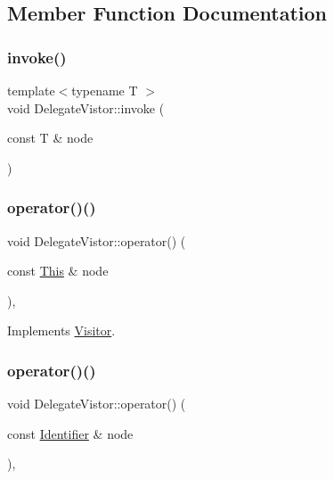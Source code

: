 \subsection{Member Function Documentation}
\mbox{\label{struct_delegate_vistor_af9662a5d46b463eaf5687383d0720da9}} 
\subsubsection{\texorpdfstring{invoke()}{invoke()}}
{\footnotesize\ttfamily template$<$typename T $>$ \\
void Delegate\+Vistor\+::invoke (\begin{DoxyParamCaption}\item[{const T \&}]{node }\end{DoxyParamCaption})\hspace{0.3cm}{\ttfamily [inline]}}

\mbox{\label{struct_delegate_vistor_a8dace5cc6d8f07fa159bf17c0e2ab35d}} 
\subsubsection{\texorpdfstring{operator()()}{operator()()}\hspace{0.1cm}{\footnotesize\ttfamily [1/60]}}
{\footnotesize\ttfamily void Delegate\+Vistor\+::operator() (\begin{DoxyParamCaption}\item[{const \hyperlink{struct_this}{This} \&}]{node }\end{DoxyParamCaption})\hspace{0.3cm}{\ttfamily [inline]}, {\ttfamily [virtual]}}



Implements \hyperlink{struct_visitor_a7a043c9da4e7f8233db48afb82dbc7bc}{Visitor}.

\mbox{\label{struct_delegate_vistor_ac0c8ef853f15168a8ecae04d0a901042}} 
\subsubsection{\texorpdfstring{operator()()}{operator()()}\hspace{0.1cm}{\footnotesize\ttfamily [2/60]}}
{\footnotesize\ttfamily void Delegate\+Vistor\+::operator() (\begin{DoxyParamCaption}\item[{const \hyperlink{struct_identifier}{Identifier} \&}]{node }\end{DoxyParamCaption})\hspace{0.3cm}{\ttfamily [inline]}, {\ttfamily [virtual]}}




